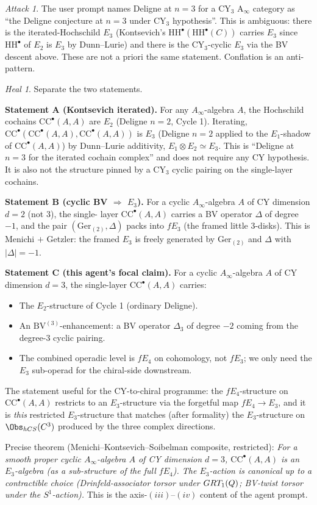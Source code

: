 \documentclass[11pt]{article}
\theoremstyle{definition}
\theoremstyle{remark}
\newtheorem*{attack}{Attack}
\newtheorem*{heal}{Heal}
\newcommand{\CC}{\mathrm{CC}}
\newcommand{\HH}{\mathrm{HH}}
\newcommand{\Ger}{\mathrm{Ger}}
\newcommand{\Ainf}{A_{\infty}}
\begin{document}
\begin{attack}
The user prompt names Deligne at $n=3$ for a CY$_3$ A$_\infty$
category as ``the Deligne conjecture at $n=3$ under CY$_3$
hypothesis''. This is ambiguous: there is the iterated-Hochschild
$E_3$ (Kontsevich's $\HH^\bullet(\HH^\bullet(C))$ carries $E_3$ since
$\HH^\bullet$ of $E_2$ is $E_3$ by Dunn--Lurie) and there is the
CY$_3$-cyclic $E_3$ via the BV descent above. These are not a priori
the same statement. Conflation is an anti-pattern.
\end{attack}

\begin{heal}
Separate the two statements.

\textbf{Statement A (Kontsevich iterated).} For any
$\Ainf$-algebra $A$, the Hochschild cochains $\CC^\bullet(A,A)$ are
$E_2$ (Deligne $n=2$, Cycle 1). Iterating, $\CC^\bullet(\CC^\bullet
(A,A), \CC^\bullet(A,A))$ is $E_3$ (Deligne $n=2$ applied to the
$E_1$-shadow of $\CC^\bullet(A,A)$) by Dunn--Lurie additivity,
$E_1 \otimes E_2 \simeq E_3$. This is ``Deligne at $n=3$ for the
iterated cochain complex'' and does not require any CY hypothesis.
It is also not the structure pinned by a CY$_3$ cyclic pairing on
the single-layer cochains.

\textbf{Statement B (cyclic BV $\Rightarrow$ $E_3$).} For a cyclic
$\Ainf$-algebra $A$ of CY dimension $d = 2$ (not $3$), the single-
layer $\CC^\bullet(A,A)$ carries a BV operator $\Delta$ of degree
$-1$, and the pair $(\Ger_{(2)}, \Delta)$ packs into $fE_3$ (the
framed little $3$-disks). This is Menichi $+$ Getzler: the framed
$E_3$ is freely generated by $\Ger_{(2)}$ and $\Delta$ with
$|\Delta| = -1$.

\textbf{Statement C (this agent's focal claim).} For a cyclic
$\Ainf$-algebra $A$ of CY dimension $d = 3$, the single-layer
$\CC^\bullet(A,A)$ carries:
\begin{itemize}
\item The $E_2$-structure of Cycle 1 (ordinary Deligne).
\item An $\mathrm{BV}^{(3)}$-enhancement: a BV operator $\Delta_3$
of degree $-2$ coming from the degree-$3$ cyclic pairing.
\item The combined operadic level is $fE_4$ on cohomology, not
$fE_3$; we only need the $E_3$ sub-operad for the chiral-side
downstream.
\end{itemize}
The statement useful for the CY-to-chiral programme: the
$fE_4$-structure on $\CC^\bullet(A,A)$ restricts to an
$E_3$-structure via the forgetful map $fE_4 \to E_3$, and it is
\emph{this} restricted $E_3$-structure that matches (after formality)
the $E_3$-structure on $\Obs_{\mathrm{hCS}}(\C^3)$ produced by the
three complex directions.

Precise theorem (Menichi--Kontsevich--Soibelman composite,
restricted): \emph{For a smooth proper cyclic $\Ainf$-algebra $A$
of CY dimension $d = 3$, $\CC^\bullet(A,A)$ is an $E_3$-algebra
(as a sub-structure of the full $fE_4$). The $E_3$-action is canonical
up to a contractible choice (Drinfeld-associator torsor under
$GRT_1(Q)$; BV-twist torsor under the $S^1$-action).} This
is the axis-$(iii)$--$(iv)$ content of the agent prompt.
\end{heal}
\end{document}
